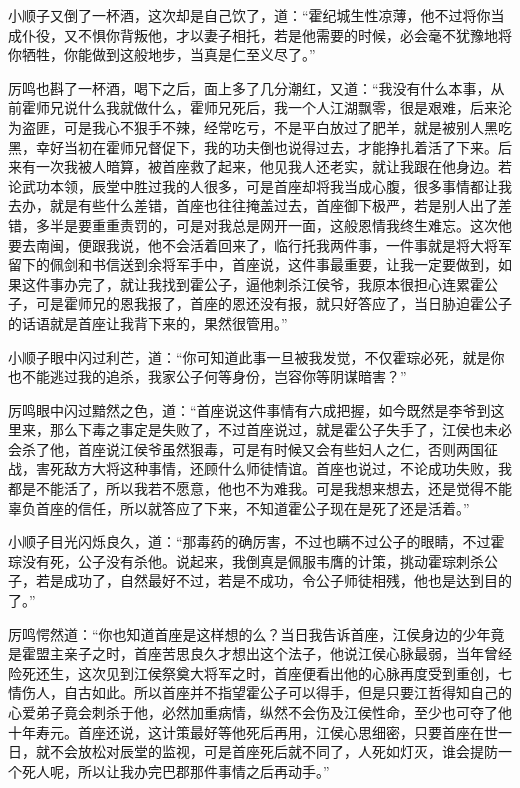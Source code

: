 小顺子又倒了一杯酒，这次却是自己饮了，道：“霍纪城生性凉薄，他不过将你当成仆役，又不惧你背叛他，才以妻子相托，若是他需要的时候，必会毫不犹豫地将你牺牲，你能做到这般地步，当真是仁至义尽了。”

厉鸣也斟了一杯酒，喝下之后，面上多了几分潮红，又道：“我没有什么本事，从前霍师兄说什么我就做什么，霍师兄死后，我一个人江湖飘零，很是艰难，后来沦为盗匪，可是我心不狠手不辣，经常吃亏，不是平白放过了肥羊，就是被别人黑吃黑，幸好当初在霍师兄督促下，我的功夫倒也说得过去，才能挣扎着活了下来。后来有一次我被人暗算，被首座救了起来，他见我人还老实，就让我跟在他身边。若论武功本领，辰堂中胜过我的人很多，可是首座却将我当成心腹，很多事情都让我去办，就是有些什么差错，首座也往往掩盖过去，首座御下极严，若是别人出了差错，多半是要重重责罚的，可是对我总是网开一面，这般恩情我终生难忘。这次他要去南闽，便跟我说，他不会活着回来了，临行托我两件事，一件事就是将大将军留下的佩剑和书信送到余将军手中，首座说，这件事最重要，让我一定要做到，如果这件事办完了，就让我找到霍公子，逼他刺杀江侯爷，我原本很担心连累霍公子，可是霍师兄的恩我报了，首座的恩还没有报，就只好答应了，当日胁迫霍公子的话语就是首座让我背下来的，果然很管用。”

小顺子眼中闪过利芒，道：“你可知道此事一旦被我发觉，不仅霍琮必死，就是你也不能逃过我的追杀，我家公子何等身份，岂容你等阴谋暗害？”

厉鸣眼中闪过黯然之色，道：“首座说这件事情有六成把握，如今既然是李爷到这里来，那么下毒之事定是失败了，不过首座说过，就是霍公子失手了，江侯也未必会杀了他，首座说江侯爷虽然狠毒，可是有时候又会有些妇人之仁，否则两国征战，害死敌方大将这种事情，还顾什么师徒情谊。首座也说过，不论成功失败，我都是不能活了，所以我若不愿意，他也不为难我。可是我想来想去，还是觉得不能辜负首座的信任，所以就答应了下来，不知道霍公子现在是死了还是活着。”

小顺子目光闪烁良久，道：“那毒药的确厉害，不过也瞒不过公子的眼睛，不过霍琮没有死，公子没有杀他。说起来，我倒真是佩服韦膺的计策，挑动霍琮刺杀公子，若是成功了，自然最好不过，若是不成功，令公子师徒相残，他也是达到目的了。”

厉鸣愕然道：“你也知道首座是这样想的么？当日我告诉首座，江侯身边的少年竟是霍盟主亲子之时，首座苦思良久才想出这个法子，他说江侯心脉最弱，当年曾经险死还生，这次见到江侯祭奠大将军之时，首座便看出他的心脉再度受到重创，七情伤人，自古如此。所以首座并不指望霍公子可以得手，但是只要江哲得知自己的心爱弟子竟会刺杀于他，必然加重病情，纵然不会伤及江侯性命，至少也可夺了他十年寿元。首座还说，这计策最好等他死后再用，江侯心思细密，只要首座在世一日，就不会放松对辰堂的监视，可是首座死后就不同了，人死如灯灭，谁会提防一个死人呢，所以让我办完巴郡那件事情之后再动手。”

